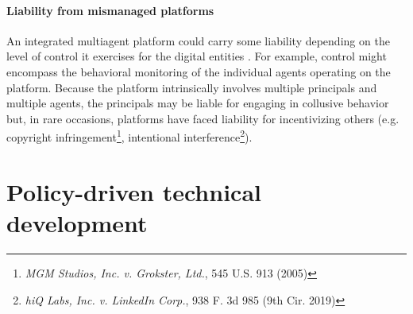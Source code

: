 \documentclass[11pt]{article}
\begin{document}

\paragraph{Liability from mismanaged platforms} An integrated multiagent platform could carry some liability depending on the level of control it exercises for the digital entities \citep{gabison_platform_2020,lefouili_economics_2022}. For example, control might encompass the behavioral monitoring of the individual agents operating on the platform. Because the platform intrinsically involves multiple principals and multiple agents, the principals may be liable for engaging in collusive behavior but, in rare occasions, platforms have faced liability for incentivizing others (e.g. copyright infringement\footnote{\textit{MGM Studios, Inc. v. Grokster, Ltd.}, 545 U.S. 913 (2005)}, intentional interference\footnote{\textit{hiQ Labs, Inc. v. LinkedIn Corp.}, 938 F. 3d 985 (9th Cir. 2019)}).





\section{Policy-driven technical development}
\end{document}
